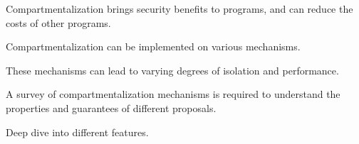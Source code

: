 Compartmentalization brings security benefits to programs, and can reduce the
costs of other programs.

Compartmentalization can be implemented on various mechanisms.

These mechanisms can lead to varying degrees of isolation and performance.

A survey of compartmentalization mechanisms is required to understand the
properties and guarantees of different proposals.

Deep dive into different features.





